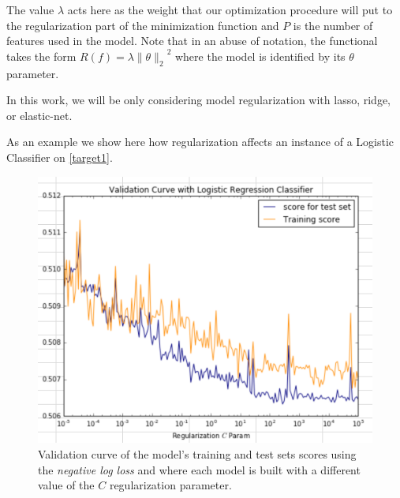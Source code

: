 


The value $\lambda$ acts here as the weight that our optimization procedure will put to the regularization part of the minimization function and $P$ is the number of features used in the model. Note that in an abuse of notation, the functional takes the form $R(f) = \lambda { \| \theta \|_{2}}^2$ where the model is identified by its $\theta$ parameter.

In this work, we will be only considering model regularization with lasso, ridge, or elastic-net.

As an example we show here how regularization affects an instance of a Logistic Classifier on \cref{target1}.


\begin{figure}[h!]
\begin{center}
\includegraphics[width=0.9\columnwidth]{figures/regularization/figure-log_loss_error_validation_curve.png}
\caption{ Validation curve of the model's training and test sets scores using the \textit{negative log loss} and where each model is built with a different value of the $C$ regularization parameter.}
\label{fig:log_loss_regularization_validation_curve}
\end{center}
\end{figure}

